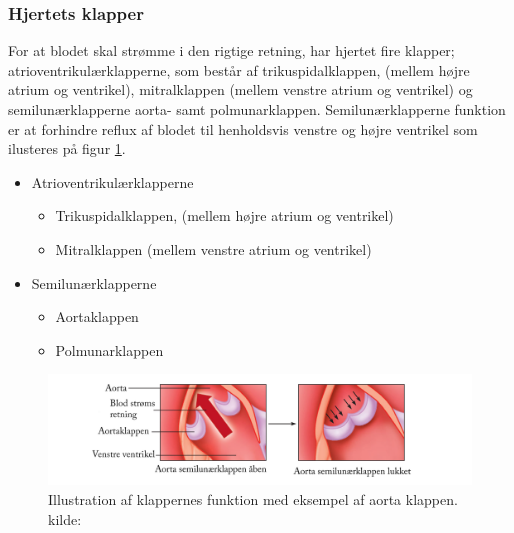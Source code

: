 \subsubsection{Hjertets klapper}
For at blodet skal strømme i den rigtige retning, har hjertet fire klapper; atrioventrikulærklapperne, som består af trikuspidalklappen, (mellem højre atrium og ventrikel), mitralklappen (mellem venstre atrium og ventrikel) og semilunærklapperne aorta- samt polmunarklappen. Semilunærklapperne funktion er at forhindre reflux af blodet til henholdsvis venstre og højre ventrikel som ilusteres på figur \ref{fig:hjerte_klap}.  \cite{gronanatomi}  

\begin{itemize} 
	\item Atrioventrikulærklapperne
		\begin{itemize} 

			\item Trikuspidalklappen, (mellem højre atrium og ventrikel)
			\item Mitralklappen (mellem venstre atrium og ventrikel)

		\end{itemize} 


	\item Semilunærklapperne

		\begin{itemize} 

			\item Aortaklappen
			\item Polmunarklappen

		\end{itemize} 		
\end{itemize} 


\begin{figure}[H] %
\begin{center}
\includegraphics[width=1\linewidth]{figures/cusp}
\end{center}
\caption{Illustration af klappernes funktion med eksempel af aorta klappen. kilde: \cite{cindy}}
\label{fig:hjerte_klap}
\end{figure}

